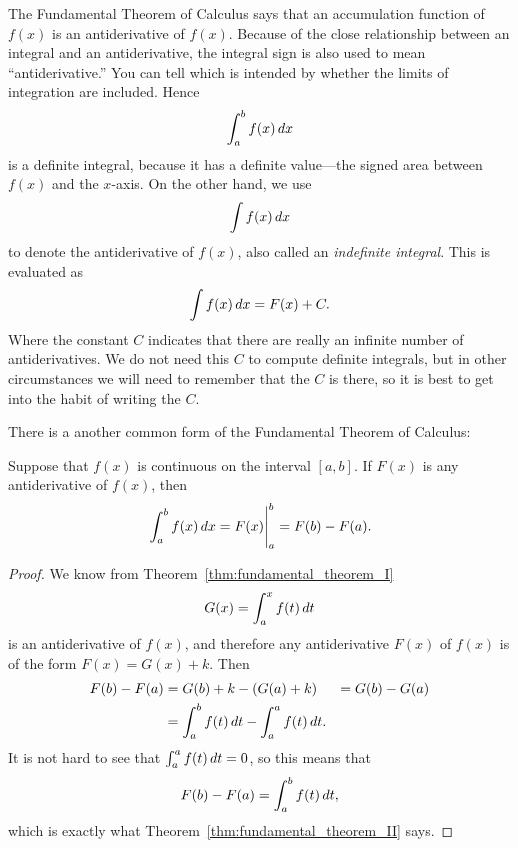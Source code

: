 The Fundamental Theorem of Calculus says that an accumulation function
of $f(x)$ is an antiderivative of $f(x)$.  Because of the close
relationship between an integral and an antiderivative, the integral
sign is also used to mean ``antiderivative.'' You can tell which is
intended by whether the limits of integration are included. Hence
\[
  \int_a^b f(x)\, d x
\] 
is a definite integral, because it has a definite value---the signed
area between $f(x)$ and the $x$-axis.  On the other hand, we use
\[
  \int f(x)\, d x
\]
to denote the antiderivative of $f(x)$, also called an
\textit{indefinite integral}.
This is evaluated as
\[
  \int f(x)\, d x = F(x)+C.
\]
Where the constant $C$ indicates that there are really an infinite
number of antiderivatives. We do not need this $C$ to compute definite
integrals, but in other circumstances we will need to remember that
the $C$ is there, so it is best to get into the habit of writing the
$C$.

There is a another common form of the Fundamental Theorem of Calculus:

\begin{mainTheorem}
\label{thm:fundamental_theorem_II}\hfil

\noindent Suppose that $f(x)$ is continuous on the interval $[a,b]$. If $F(x)$
is any antiderivative of $f(x)$, then
\[
  \left.\int_a^b f(x)\, d x = F(x) \right|_a^b = F(b)-F(a).
\]
\end{mainTheorem}

\begin{proof}
We know from Theorem~\ref{thm:fundamental_theorem_I} 
\[
  G(x)=\int_a^x f(t)\, d t
\]
is an antiderivative of $f(x)$, and therefore any antiderivative
$F(x)$ of $f(x)$ is of the form $F(x)=G(x)+k$. Then 
\begin{align*}
  F(b)-F(a) &=G(b)+k-(G(a)+k) 
  &= G(b)-G(a) \\
  &=\int_a^b f(t)\, d t-\int_a^a f(t)\, d t.
\end{align*}
It is not hard to see that $\int_a^a f(t)\, d t=0$, so this means that
\[
  F(b)-F(a)=\int_a^b f(t)\, d t,
\]
which is exactly what Theorem~\ref{thm:fundamental_theorem_II} says.
\end{proof}

